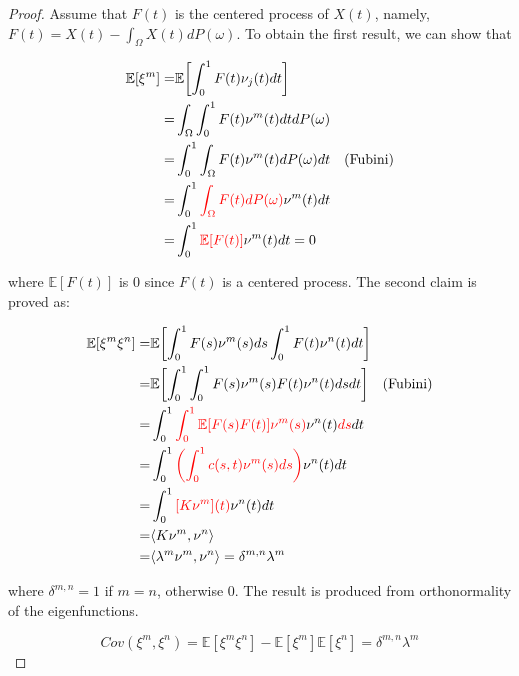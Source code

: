 \documentclass[11pt,twoside,a4paper]{article}
\begin{document}
	\begin{proof}
		Assume that $F(t)$ is the centered process of $X(t)$, namely, $F(t) = X(t) - \int_{\Omega}X(t)dP(\omega)$. To obtain the first result, we can show that
		
		\begin{equation}\label{Lemma1}
			\begin{split}
				\mathbb{E}[\xi^m] = & \mathbb{E} \biggl\lbrack \int_{0}^{1} F(t) \nu_{j}(t)dt\biggr\rbrack\\
				= & \int_{\Omega} \int_{0}^{1} F(t) \nu^m(t) dt dP(\omega)\\
				= & \int_{0}^{1} \int_{\Omega} F(t) \nu^m(t) dP(\omega) dt \quad \text{(Fubini)}\\
				= & \int_{0}^{1} {\color{red}\int_{\Omega} F(t) dP(\omega)} \nu^m(t) dt\\
				= & \int_{0}^{1} {\color{red}\mathbb{E}[F(t)]} \nu^m(t) dt = 0
			\end{split}
		\end{equation}
	
		where $\mathbb{E}[F(t)]$ is 0 since $F(t)$ is a centered process.
		The second claim is proved as:
		
		\begin{equation}\label{Lemma2}
			\begin{split}
				\mathbb{E} [\xi^m \xi^n] = & \mathbb{E}  \biggl\lbrack \int_{0}^{1} F(s) \nu^m(s)ds \int_{0}^{1} F(t) \nu^n(t)dt  \biggr\rbrack\\
				= & \mathbb{E} \biggl\lbrack {\int_{0}^{1} \int_{0}^{1} F(s) \nu^m(s) F(t) \nu^n(t) ds dt} \biggr\rbrack \quad \text{(Fubini)}\\
				= & \int_{0}^{1} {\color{red}\int_{0}^{1} \mathbb{E}[{F(s)F(t)}] \nu^m(s)} \nu^n(t) {\color{red}ds} dt\\
				= & \int_{0}^{1} {\color{red}\left(\int_{0}^{1}c(s,t)\nu^m(s)ds \right)} \nu^n(t) dt \\
				= & \int_{0}^{1}{\color{red}[K\nu^m](t)}\nu^n(t)dt\\
				= & \langle K \nu^m, \nu^n \rangle\\
				= & \langle \lambda^m \nu^m, \nu^n \rangle = \delta^{m,n}\lambda^{m}
			\end{split}
		\end{equation}
	
		where $\delta^{m,n} = 1$ if $m = n$, otherwise 0. The result is produced from orthonormality of the eigenfunctions.
		
		\begin{equation}
			Cov\left(\xi^m, \xi^n\right) = \mathbb{E}[\xi^m \xi^n] - \mathbb{E}[\xi^m]\mathbb{E}[\xi^n] = \delta^{m,n}\lambda^{m}
		\end{equation}
	

\end{proof}
\end{document}
